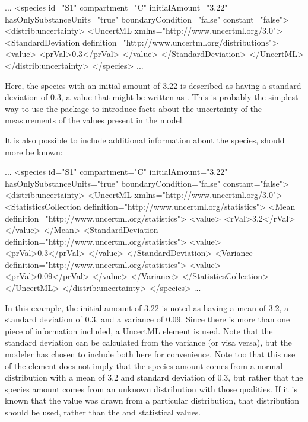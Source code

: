 \documentclass[draftspec]{sbmlpkgspec}
\newcommand{\Uncertainty}{\defRef{Uncertainty}{uncertainty-class}}
\newcommand{\uncertml}{UncertML\xspace}
\begin{document}
\begin{example}
...
      <species id="S1" compartment="C" initialAmount="3.22" hasOnlySubstanceUnits="true"
               boundaryCondition="false" constant="false">
        <distrib:uncertainty>
          <UncertML xmlns="http://www.uncertml.org/3.0">
            <StandardDeviation definition="http://www.uncertml.org/distributions">
              <value>
                <prVal>0.3</prVal>
              </value>
            </StandardDeviation>
          </UncertML>
        </distrib:uncertainty>
      </species>
...
\end{example}

Here, the species with an initial amount of 3.22 is described as having a standard deviation of 0.3, a value that might be written as .  This is probably the simplest way to use the package to introduce facts about the uncertainty of the measurements of the values present in the model.

It is also possible to include additional information about the species, should more be known:

\begin{example}
...
      <species id="S1" compartment="C" initialAmount="3.22" hasOnlySubstanceUnits="true"
               boundaryCondition="false" constant="false">
        <distrib:uncertainty>
          <UncertML xmlns="http://www.uncertml.org/3.0">
            <StatisticsCollection definition="http://www.uncertml.org/statistics">
              <Mean definition="http://www.uncertml.org/statistics">
                <value>
                  <rVal>3.2</rVal>
                </value>
              </Mean>
              <StandardDeviation definition="http://www.uncertml.org/statistics">
                <value>
                  <prVal>0.3</prVal>
                </value>
              </StandardDeviation>
              <Variance definition="http://www.uncertml.org/statistics">
                <value>
                  <prVal>0.09</prVal>
                </value>
              </Variance>
            </StatisticsCollection>
          </UncertML>
        </distrib:uncertainty>
      </species>
...
\end{example}

In this example, the initial amount of 3.22 is noted as having a mean of 3.2, a standard deviation of 0.3, and a variance of 0.09.  Since there is more than one piece of information included, a  \uncertml element is used.  Note that the standard deviation can be calculated from the variance (or visa versa), but the modeler has chosen to include both here for convenience.  Note too that this use of the \Uncertainty element does not imply that the species amount comes from a normal distribution with a mean of 3.2 and standard deviation of 0.3, but rather that the species amount comes from an unknown distribution with those qualities.  If it is known that the value was drawn from a particular distribution, that distribution should be used, rather than the  and  statistical values.
\end{document}
